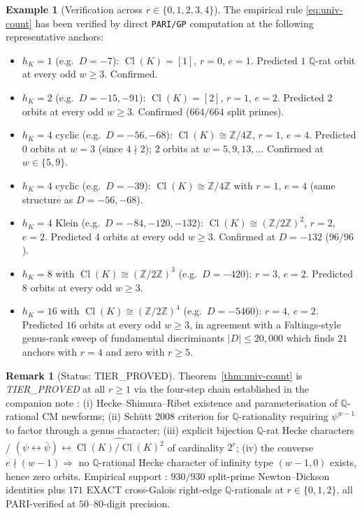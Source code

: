 \documentclass[11pt,a4paper]{amsart}
\theoremstyle{plain}
\theoremstyle{definition}
\newtheorem{remark}[theorem]{Remark}
\newtheorem{example}[theorem]{Example}
\DeclareMathOperator{\Cl}{Cl}
\newcommand{\Q}{\mathbb{Q}}
\newcommand{\Z}{\mathbb{Z}}
\begin{document}
\begin{example}[Verification across $r \in \{0,1,2,3,4\}$]\label{ex:hK-cyclic}
The empirical rule \eqref{eq:univ-count} has been verified by direct
\texttt{PARI/GP} computation at the following representative anchors:
\begin{itemize}
\item $h_K = 1$ (e.g.\ $D = -7$): $\Cl(K) = [1]$, $r = 0$, $e = 1$.
Predicted $1$ $\Q$-rat orbit at every odd $w \ge 3$. Confirmed.
\item $h_K = 2$ (e.g.\ $D = -15, -91$): $\Cl(K) = [2]$, $r = 1$,
$e = 2$. Predicted $2$ orbits at every odd $w \ge 3$. Confirmed
($664/664$ split primes).
\item $h_K = 4$ cyclic (e.g.\ $D = -56, -68$): $\Cl(K) \cong \Z/4\Z$,
$r = 1$, $e = 4$. Predicted $0$ orbits at $w = 3$ (since $4 \nmid 2$);
$2$ orbits at $w = 5, 9, 13, \ldots$ Confirmed at $w \in \{5, 9\}$.
\item $h_K = 4$ cyclic (e.g.\ $D = -39$): $\Cl(K) \cong \Z/4\Z$ with
$r = 1$, $e = 4$ (same structure as $D = -56, -68$).
\item $h_K = 4$ Klein (e.g.\ $D = -84, -120, -132$): $\Cl(K) \cong
(\Z/2\Z)^2$, $r = 2$, $e = 2$. Predicted $4$ orbits at every odd
$w \ge 3$. Confirmed at $D = -132$ ($96/96$).
\item $h_K = 8$ with $\Cl(K) \cong (\Z/2\Z)^3$ (e.g.\ $D = -420$):
$r = 3$, $e = 2$. Predicted $8$ orbits at every odd $w \ge 3$.
\item $h_K = 16$ with $\Cl(K) \cong (\Z/2\Z)^4$ (e.g.\ $D = -5460$):
$r = 4$, $e = 2$. Predicted $16$ orbits at every odd $w \ge 3$, in
agreement with a Faltings-style genus-rank sweep of fundamental
discriminants $|D| \le 20{,}000$ which finds $21$ anchors with $r = 4$
and zero with $r \ge 5$.
\end{itemize}
\end{example}

\begin{remark}[Status: TIER\_PROVED]\label{rem:thm-D-status}
Theorem~\ref{thm:univ-count} is \textit{TIER\_PROVED} at all $r \ge 1$
via the four-step chain established in the companion note
\cite[OP-THM-D-RIGOROUS]{Remondiere2026qD} :
(i) Hecke--Shimura--Ribet existence and parameterisation of
$\Q$-rational CM newforms; (ii) Sch\"utt 2008
\cite{Schutt2008} criterion for $\Q$-rationality requiring $\psi^{w-1}$
to factor through a genus character; (iii) explicit bijection
$\Q$-rat Hecke characters / $(\psi \leftrightarrow \bar\psi) \leftrightarrow
\widehat{\Cl(K)/\Cl(K)^2}$ of cardinality $2^r$; (iv) the converse
$e \nmid (w-1) \Rightarrow$ no $\Q$-rational Hecke character of
infinity type $(w-1, 0)$ exists, hence zero orbits.
Empirical support : $930/930$ split-prime Newton--Dickson identities
plus $171$ EXACT cross-Galois right-edge $\Q$-rationals at
$r \in \{0, 1, 2\}$, all PARI-verified at $50$--$80$-digit precision.
\end{remark}
\end{document}
